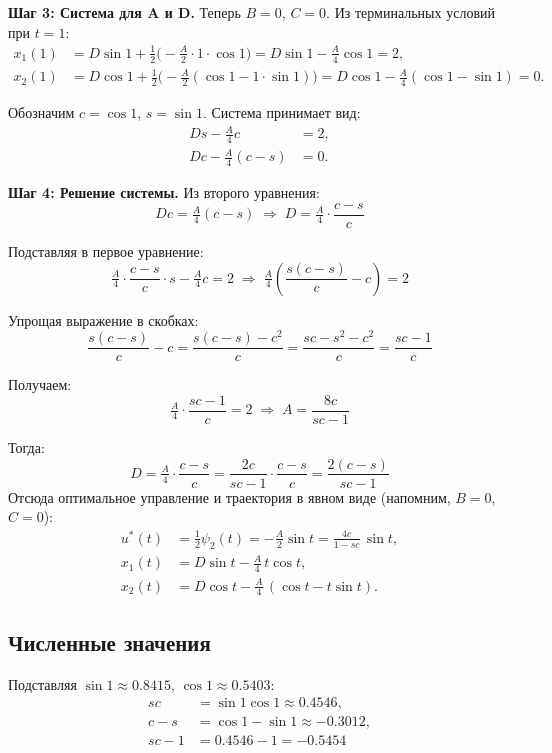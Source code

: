 \textbf{Шаг 3: Система для A и D.} Теперь $B=0$, $C=0$. Из терминальных условий при $t=1$:
\begin{align}
 x_1(1) &= D\sin 1 + \tfrac{1}{2}\Big(-\tfrac{A}{2}\cdot 1\cdot\cos 1\Big) = D\sin 1 - \tfrac{A}{4}\cos 1 = 2,\\
 x_2(1) &= D\cos 1 + \tfrac{1}{2}\Big(-\tfrac{A}{2}(\cos 1 - 1\cdot\sin 1)\Big) = D\cos 1 - \tfrac{A}{4}(\cos 1 - \sin 1) = 0.
\end{align}

Обозначим $c=\cos 1$, $s=\sin 1$. Система принимает вид:
\begin{align}
 Ds - \tfrac{A}{4}c &= 2,\\
 Dc - \tfrac{A}{4}(c-s) &= 0.
\end{align}

\textbf{Шаг 4: Решение системы.} Из второго уравнения:
\[
Dc = \tfrac{A}{4}(c-s) \;\Rightarrow\; D = \tfrac{A}{4}\cdot\frac{c-s}{c}
\]

Подставляя в первое уравнение:
\[
\tfrac{A}{4}\cdot\frac{c-s}{c}\cdot s - \tfrac{A}{4}c = 2 \;\Rightarrow\; \tfrac{A}{4}\left(\frac{s(c-s)}{c} - c\right) = 2
\]

Упрощая выражение в скобках:
\[
\frac{s(c-s)}{c} - c = \frac{s(c-s) - c^2}{c} = \frac{sc - s^2 - c^2}{c} = \frac{sc - 1}{c}
\]

Получаем:
\[
\tfrac{A}{4}\cdot\frac{sc-1}{c} = 2 \;\Rightarrow\; A = \frac{8c}{sc-1}
\]

Тогда:
\[
D = \tfrac{A}{4}\cdot\frac{c-s}{c} = \frac{2c}{sc-1}\cdot\frac{c-s}{c} = \frac{2(c-s)}{sc-1}
\]
Отсюда оптимальное управление и траектория в явном виде (напомним, $B=0$, $C=0$):
\begin{align}
 u^*(t) &= \tfrac{1}{2}\psi_2(t) = -\tfrac{A}{2}\sin t = \frac{4c}{1-sc}\,\sin t,\\
 x_1(t) &= D\sin t - \tfrac{A}{4}\,t\cos t,\\
 x_2(t) &= D\cos t - \tfrac{A}{4}\,(\cos t - t\sin t).
\end{align}

\subsection{Численные значения}
Подставляя $\sin 1 \approx 0.8415$, $\cos 1 \approx 0.5403$:
\begin{align}
 sc &= \sin 1 \cos 1 \approx 0.4546,\\
 c-s &= \cos 1 - \sin 1 \approx -0.3012,\\
 sc-1 &= 0.4546 - 1 = -0.5454
\end{align}

